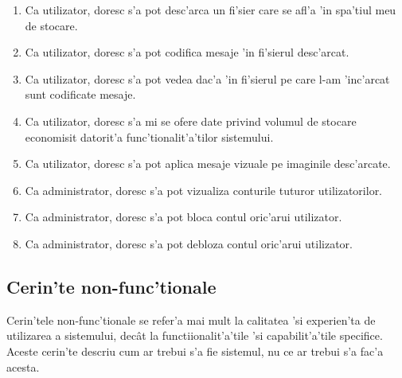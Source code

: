 \documentclass[12pt,a4paper,twoside]{report}
\begin{document}
\begin{enumerate}[label=CF\arabic*]
\item{Ca utilizator, doresc s'a pot desc'arca un fi'sier care se afl'a 'in spa'tiul meu de stocare.}
\item{Ca utilizator, doresc s'a pot codifica mesaje 'in fi'sierul desc'arcat.}
\item{Ca utilizator, doresc s'a pot vedea dac'a 'in fi'sierul pe care l-am 'inc'arcat sunt codificate  mesaje.}
\item{Ca utilizator, doresc s'a mi se ofere date privind volumul de stocare economisit datorit'a func'tionalit'a'tilor sistemului.}
\item{Ca utilizator, doresc s'a pot aplica mesaje vizuale pe imaginile desc'arcate.}
\item{Ca administrator, doresc s'a pot vizualiza conturile tuturor utilizatorilor.}
\item{Ca administrator, doresc s'a pot bloca contul oric'arui utilizator.}
\item{Ca administrator, doresc s'a pot debloza contul oric'arui utilizator.}
\end{enumerate}

\subsection{Cerin'te non-func'tionale}
Cerin'tele non-func'tionale se refer'a mai mult la calitatea 'si experien'ta de utilizarea a sistemului, decât la functiionalit'a'tile 'si capabilit'a'tile specifice. Aceste cerin'te descriu cum ar trebui s'a fie sistemul, nu ce ar trebui s'a fac'a acesta.
\end{document}
